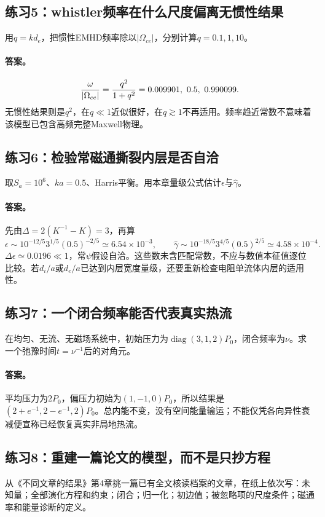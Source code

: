 \documentclass[UTF8,a4paper,11pt,openany,fontset=fandol]{ctexbook}
\begin{document}
\subsection{练习5：whistler频率在什么尺度偏离无惯性结果}
用$q=kd_e$，把惯性EMHD频率除以$|\Omega_{ce}|$，分别计算$q=0.1,1,10$。
\paragraph{答案。}
\begin{equation}
 {\omega\over|\Omega_{ce}|}={q^2\over1+q^2}
 =0.009901,\ 0.5,\ 0.990099.
\end{equation}
无惯性结果则是$q^2$，在$q\ll1$近似很好，在$q\gtrsim1$不再适用。频率趋近常数不意味着该模型已包含高频完整Maxwell物理。

\subsection{练习6：检验常磁通撕裂内层是否自洽}
取$S_a=10^6$、$ka=0.5$、Harris平衡。用本章量级公式估计$\epsilon$与$\hat\gamma$。
\paragraph{答案。}
先由$\Delta=2(K^{-1}-K)=3$，再算
\begin{equation}
 \epsilon\sim10^{-12/5}3^{1/5}(0.5)^{-2/5}
 \simeq6.54\times10^{-3},\qquad
 \hat\gamma\sim10^{-18/5}3^{4/5}(0.5)^{2/5}
 \simeq4.58\times10^{-4}.
\end{equation}
$\Delta\epsilon\simeq0.0196\ll1$，常$\psi$假设自洽。这些数未含匹配常数，不应与数值本征值逐位比较。若$d_i/a$或$d_e/a$已达到内层宽度量级，还要重新检查电阻单流体内层的适用性。

\subsection{练习7：一个闭合频率能否代表真实热流}
在均匀、无流、无磁场系统中，初始压力为$\operatorname{diag}(3,1,2)P_0$，闭合频率为$\nu$。求一个弛豫时间$t=\nu^{-1}$后的对角元。
\paragraph{答案。}
平均压力为$2P_0$，偏压力初始为$(1,-1,0)P_0$，所以结果是
$ (2+e^{-1},2-e^{-1},2)P_0$。总内能不变，没有空间能量输运；不能仅凭各向异性衰减便宣称已经恢复真实非局地热流。

\subsection{练习8：重建一篇论文的模型，而不是只抄方程}
从《不同文章的结果》第4章挑一篇已有全文核读档案的文章，在纸上依次写：未知量；全部演化方程和约束；闭合；归一化；初边值；被忽略项的尺度条件；磁通率和能量诊断的定义。
\end{document}
